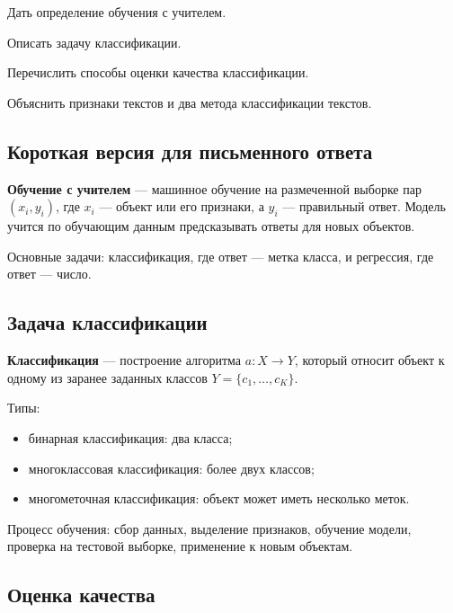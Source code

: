 
\begin{examplan}
    \item Дать определение обучения с учителем.
    \item Описать задачу классификации.
    \item Перечислить способы оценки качества классификации.
    \item Объяснить признаки текстов и два метода классификации текстов.
\end{examplan}

\subsection*{Короткая версия для письменного ответа}

\textbf{Обучение с учителем} --- машинное обучение на размеченной выборке пар $(x_i,y_i)$, где $x_i$ --- объект или его признаки, а $y_i$ --- правильный ответ. Модель учится по обучающим данным предсказывать ответы для новых объектов.

Основные задачи: классификация, где ответ --- метка класса, и регрессия, где ответ --- число.

\subsection*{Задача классификации}

\textbf{Классификация} --- построение алгоритма $a:X\to Y$, который относит объект к одному из заранее заданных классов $Y=\{c_1,\ldots,c_K\}$.

Типы:
\begin{itemize}
    \item бинарная классификация: два класса;
    \item многоклассовая классификация: более двух классов;
    \item многометочная классификация: объект может иметь несколько меток.
\end{itemize}

Процесс обучения: сбор данных, выделение признаков, обучение модели, проверка на тестовой выборке, применение к новым объектам.

\subsection*{Оценка качества}

